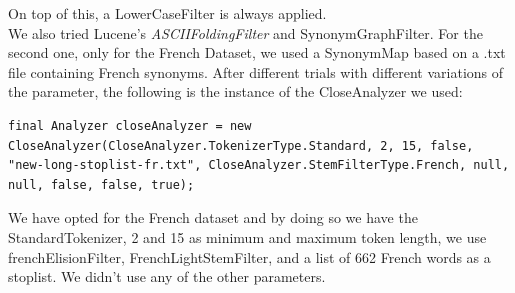 On top of this, a LowerCaseFilter is always applied. \\
We also tried Lucene's \textit{ASCIIFoldingFilter} and SynonymGraphFilter. For the second one, only for the French Dataset, we used a SynonymMap based on a .txt file containing French synonyms.
\newline
After different trials with different variations of the parameter, the following is the instance of the CloseAnalyzer we used:

\begin{lstlisting}
final Analyzer closeAnalyzer = new CloseAnalyzer(CloseAnalyzer.TokenizerType.Standard, 2, 15, false, "new-long-stoplist-fr.txt", CloseAnalyzer.StemFilterType.French, null, null, false, false, true);
\end{lstlisting}
We have opted for the French dataset and by doing so we have the StandardTokenizer, 2 and 15 as minimum and maximum token length, we use frenchElisionFilter, FrenchLightStemFilter, and a list of 662 French words as a stoplist. We didn't use any of the other parameters.



